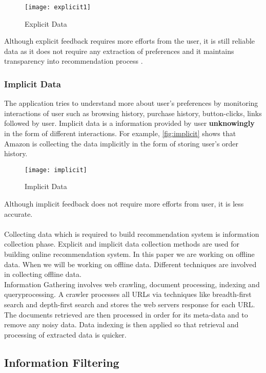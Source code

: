 \begin{figure}[H]
	\centering
	\texttt{[image: explicit1]}
	\caption{Explicit Data \cite{36}}
	\label{fig:explicit}
\end{figure}

\noindent Although explicit feedback requires more efforts from the user, it is still reliable data as it does not require any extraction of preferences and it maintains transparency into recommendation process \cite{35}. 
 
\subsubsection{Implicit Data}

The application tries to understand more about user's preferences by monitoring interactions of user such as browsing history, purchase history, button-clicks, links followed by user. Implicit data is a information provided by user \textbf{unknowingly} in the form of different interactions. For example, \autoref{fig:implicit} shows that Amazon is collecting the data implicitly in the form of storing user's order history. 
\begin{figure}[H]
	\centering
	\texttt{[image: implicit]}
	\caption{Implicit Data \cite{36}}
	\label{fig:implicit}
\end{figure}

\noindent Although implicit feedback does not require more efforts from user, it is less accurate.\\
\\
Collecting data which is required to build recommendation system is information collection phase. Explicit and implicit data collection methods are used for building online recommendation system. In this paper we are working on offline data. When we will be working on offline data. Different techniques are involved in collecting offline data. \\
Information Gathering involves web crawling, document processing, indexing and queryprocessing. A crawler processes all URLs via techniques like breadth-first search and depth-first search and stores the web servers response for each URL. The documents retrieved are then processed in order for its meta-data and to remove any noisy data. Data indexing is then applied so that retrieval and processing of extracted data is quicker. 


\subsection{Information Filtering}

